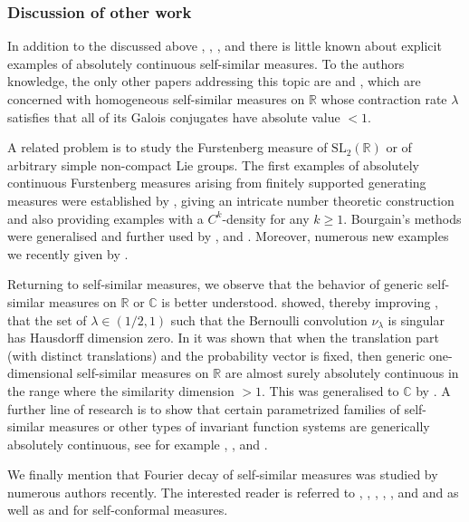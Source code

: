 \documentclass[10pt, english,oneside,reqno]{amsart}
\theoremstyle{plain}
\theoremstyle{remark}
\numberwithin{equation}{section}
\numberwithin{figure}{section}
\newcommand{\R}{\mathbb{R}}
\newcommand{\C}{\mathbb{C}}
\begin{document}
    
    \subsubsection*{\normalfont\textbf{Discussion of other work}}

    In addition to the discussed above \cite{Garsia1962}, \cite{SolomyakXu2003}, \cite{LindenstraussVarju206}, \cite{Varju2019} and \cite{Kittle2021} there is little known about explicit examples of absolutely continuous self-similar measures. To the authors knowledge, the only other papers addressing this topic are \cite{DaiFengWang2007} and \cite{Streck24}, which are concerned with homogeneous self-similar measures on $\R$ whose contraction rate $\lambda$ satisfies that all of its Galois conjugates have absolute value $< 1$. 

    A related problem is to study the Furstenberg measure of $\mathrm{SL}_2(\R)$ or of arbitrary simple non-compact Lie groups. The first examples of absolutely continuous Furstenberg measures arising from finitely supported generating measures were established by \cite{Bourgain2012}, giving an intricate number theoretic construction and also providing examples with a $C^k$-density for any $k\geq 1$. Bourgain's methods were generalised and further used by \cite{BoutonnetIoanaSalehiGolsefidy2017}, \cite{Lequen2022} and \cite{Kogler2022}. Moreover, numerous new examples we recently given by \cite{Kittle2023}.

    Returning to self-similar measures, we observe that the behavior of generic self-similar measures on $\R$ or $\C$ is better understood. \cite{Shmerkin2014} showed, thereby improving \cite{Solomyak1995}, that the set of $\lambda \in (1/2,1)$ such that the Bernoulli convolution $\nu_{\lambda}$ is singular has Hausdorff dimension zero. In \cite{SagliettiShmerkinSolomyak2018} it was shown that when the translation part (with distinct translations) and the probability vector is fixed, then generic one-dimensional self-similar measures on $\R$ are almost surely absolutely continuous in the range where the similarity dimension $>1$. This was generalised to $\C$ by \cite{SolomyakSpiewak2023}. A further line of research is to show that certain parametrized families of self-similar measures or other types of invariant function systems are generically absolutely continuous, see for example \cite{Hochman2014}, \cite{Hochman2017}, \cite{ShmerkinSolomyak2016Second} and \cite{BaranySimonSolomyak2022}.

    We finally mention that Fourier decay of self-similar measures was studied by numerous authors recently. The interested reader is referred to \cite{LiSahlsten2020}, \cite{Bremont2021}, \cite{LiSahlsten2022}, \cite{Rapaport2022}, \cite{Solomyak2022}, \cite{VarjuYu2022} and \cite{BakerKhalilSahlsten2024} and as well as \cite{AlgomRHWang} and \cite{BakerSahlsten2023} for self-conformal measures.
    
\end{document}
